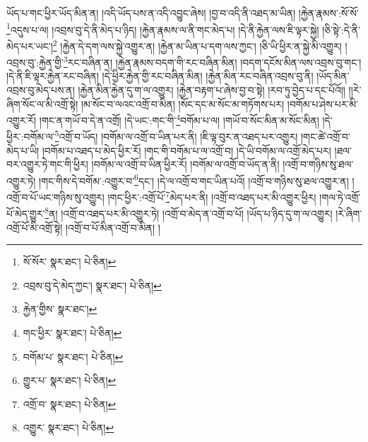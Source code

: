 ཡོད་པ་གང་ཕྱིར་ཡོད་མིན་ན། །འདི་ཡོད་པས་ན་འདི་འབྱུང་ཞེས། །བྱ་བ་འདི་ནི་འཐད་མ་ཡིན། །རྐྱེན་རྣམས་:སོ་སོ་\footnote{སོ་སོར་  སྣར་ཐང་།  པེ་ཅིན། }འདུས་པ་ལ། །འབྲས་བུ་དེ་ནི་མེད་པ་ཉིད། །རྐྱེན་རྣམས་ལ་ནི་གང་མེད་པ། །དེ་ནི་རྐྱེན་ལས་ཇི་ལྟར་སྐྱེ། །ཅི་སྟེ་:དེ་ནི་མེད་པར་ཡང་།\footnote{འབྲས་བུ་དེ་མེད་ཀྱང་།  སྣར་ཐང་།  པེ་ཅིན། } །རྐྱེན་དེ་དག་ལས་སྐྱེ་འགྱུར་ན། །རྐྱེན་མ་ཡིན་པ་དག་ལས་ཀྱང་། །ཅི་ཡི་ཕྱིར་ན་སྐྱེ་མི་འགྱུར། །འབྲས་བུ་:རྐྱེན་གྱི་\footnote{རྐྱེན་གྱིས་  སྣར་ཐང་། }རང་བཞིན་ན། །རྐྱེན་རྣམས་བདག་གི་རང་བཞིན་མིན། །བདག་དངོས་མིན་ལས་འབྲས་བུ་གང་། །དེ་ནི་ཇི་ལྟར་རྐྱེན་རང་བཞིན། །དེ་ཕྱིར་རྐྱེན་གྱི་རང་བཞིན་མིན། །རྐྱེན་མིན་རང་བཞིན་འབྲས་བུ་ནི། །ཡོད་མིན་འབྲས་བུ་མེད་པས་ན། །རྐྱེན་མིན་རྐྱེན་དུ་ག་ལ་འགྱུར། །རྐྱེན་བརྟག་པ་ཞེས་བྱ་བ་སྟེ། །རབ་ཏུ་བྱེད་པ་དང་པོའོ།། །།རེ་ཞིག་སོང་ལ་མི་འགྲོ་སྟེ། །མ་སོང་བ་ལའང་འགྲོ་བ་མིན། །སོང་དང་མ་སོང་མ་གཏོགས་པར། །བགོམ་པ་ཤེས་པར་མི་འགྱུར་རོ། །གང་ན་གཡོ་བ་དེ་ན་འགྲོ། །དེ་ཡང་:གང་གི་\footnote{གང་ཕྱིར་  སྣར་ཐང་།  པེ་ཅིན། }བགོམ་པ་ལ། །གཡོ་བ་སོང་མིན་མ་སོང་མིན། །དེ་ཕྱིར་:བགོམ་ལ་\footnote{བགོམ་པ་  སྣར་ཐང་།  པེ་ཅིན། }འགྲོ་བ་ཡོད། །བགོམ་ལ་འགྲོ་བ་ཡིན་པར་ནི། །ཇི་ལྟ་བུར་ན་འཐད་པར་འགྱུར། །གང་ཚེ་འགྲོ་བ་མེད་པ་ཡི། །བགོམ་པ་འཐད་པ་མེད་ཕྱིར་རོ། །གང་གི་བགོམ་པ་ལ་འགྲོ་བ། །དེ་ཡི་བགོམ་ལ་འགྲོ་མེད་པར། །ཐལ་བར་འགྱུར་ཏེ་གང་གི་ཕྱིར། །བགོམ་ལ་འགྲོ་བ་ཡིན་ཕྱིར་རོ། །བགོམ་ལ་འགྲོ་བ་ཡོད་ན་ནི། །འགྲོ་བ་གཉིས་སུ་ཐལ་འགྱུར་ཏེ། །གང་གིས་དེ་བགོམ་:འགྱུར་བ་\footnote{གྱུར་པ་  སྣར་ཐང་།  པེ་ཅིན། }དང་། །དེ་ལ་འགྲོ་བ་གང་ཡིན་པའོ། །འགྲོ་བ་གཉིས་སུ་ཐལ་འགྱུར་ན། །འགྲོ་བ་པོ་ཡང་གཉིས་སུ་འགྱུར། །གང་ཕྱིར་:འགྲོ་པོ་\footnote{འགྲོ་བ་  སྣར་ཐང་།  པེ་ཅིན། }མེད་པར་ནི། །འགྲོ་བ་འཐད་པར་མི་འགྱུར་ཕྱིར། །གལ་ཏེ་འགྲོ་པོ་མེད་གྱུར་\footnote{འགྱུར་  སྣར་ཐང་།  པེ་ཅིན། }ན། །འགྲོ་བ་འཐད་པར་མི་འགྱུར་ཏེ། །འགྲོ་བ་མེད་ན་འགྲོ་བ་པོ། །ཡོད་པ་ཉིད་དུ་ག་ལ་འགྱུར། །རེ་ཞིག་འགྲོ་པོ་མི་འགྲོ་སྟེ། །འགྲོ་བ་པོ་མིན་འགྲོ་བ་མིན། །
